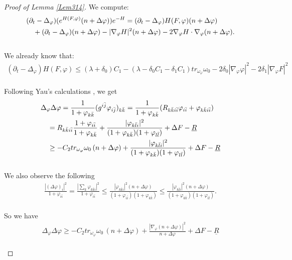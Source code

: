 \documentclass[11pt]{amsart}
\numberwithin{equation}{section}
\begin{document}
\begin{proof}[Proof of Lemma \ref{Lem314}]
 We compute:
\begin{align}
	&(\partial_t - \Delta_{\varphi})(e^{H(F,\varphi)}(n+\Delta\varphi))e^{-H} = (\partial_t - \Delta_{\varphi})H(F,\varphi)(n+\Delta\varphi) \notag\\
	&\quad + (\partial_t - \Delta_{\varphi})(n+\Delta\varphi) - |\nabla_{\varphi}H|^2(n+\Delta\varphi) - 2\nabla_{\varphi}H \cdot \nabla_{\varphi}(n+\Delta\varphi).
\end{align}\\
We already know that:
\begin{align}
	(\partial_t-\Delta_{\varphi})H(F,\varphi) \le  (\lambda+\delta_0)C_1 -(\lambda-\delta_0 C_1-\delta_1C_1)tr_{\omega_{\varphi}}\omega_0 -2\delta_0|\nabla_\varphi\varphi|^2-2\delta_1|\nabla_\varphi F|^2 
\end{align}\\
Following Yau's calculations \cite{Yau1978}, we get
\begin{align}\label{Yau}
	&\Delta_\varphi\Delta\varphi =\frac{1}{1+\varphi_{k\bar k}}(g^{i\bar j}\varphi_{i\bar j})_{k\bar k} = \frac{1}{1+\varphi_{k\bar k}} (R_{k\bar ki\bar i}\varphi_{i\bar i} +\varphi_{k\bar ki\bar i}) \notag \\	
	&\quad	=R_{k\bar ki\bar i}\frac{1+\varphi_{i\bar i}}{1+\varphi_{k\bar k}} + \frac{|\varphi_{k\bar l i}|^2}{(1 + \varphi_{k\bar k})(1 + \varphi_{l\bar l})} +\Delta F-\underline R \notag \\
	&\quad \ge  -C_2 tr_{\omega_{\varphi}}\omega_0\,(n+\Delta\varphi) + \frac{|\varphi_{k\bar l i}|^2}{(1 + \varphi_{k\bar k})(1 + \varphi_{l\bar l})} +\Delta F-\underline R
\end{align}\\
We also observe the following 
\begin{align}
	\frac{|(\Delta\varphi)_i|^2}{1 + \varphi_{i\bar{i}}} = \frac{\left|\sum_k \varphi_{k\bar{k}i}\right|^2}{1 + \varphi_{i\bar{i}}} \le  \frac{|\varphi_{k\bar{k}i}|^2 (n + \Delta\varphi)}{(1 + \varphi_{i\bar{i}})(1 + \varphi_{k\bar{k}})} \le  \frac{|\varphi_{k\bar{l}i}|^2 (n + \Delta\varphi)}{(1 + \varphi_{k\bar{k}})(1 + \varphi_{l\bar{l}})}.
\end{align}\\
So we have 
\begin{align}
	\Delta_\varphi\Delta\varphi \ge  -C_2 tr_{\omega_{\varphi}}\omega_0\,(n+\Delta\varphi) + \frac{|\nabla_{\varphi}(n+\Delta\varphi)|^2}{n+\Delta\varphi} +\Delta F-\underline R
\end{align}\\

\end{proof}
\end{document}
